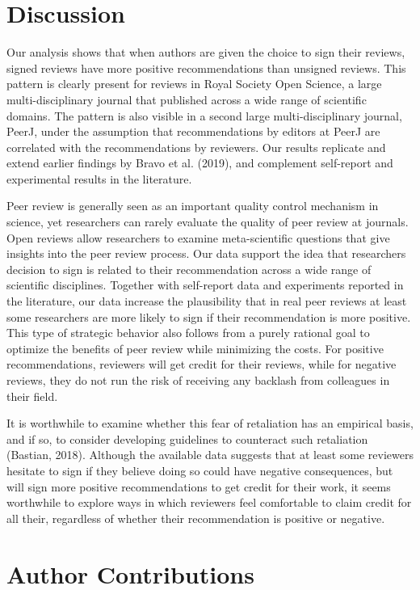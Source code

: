 \documentclass[,jou, a4paper,floatsintext]{apa6}
\begin{document}
\hypertarget{discussion}{%
\section{Discussion}\label{discussion}}

Our analysis shows that when authors are given the choice to sign their reviews, signed reviews have more positive recommendations than unsigned reviews. This pattern is clearly present for reviews in Royal Society Open Science, a large multi-disciplinary journal that published across a wide range of scientific domains. The pattern is also visible in a second large multi-disciplinary journal, PeerJ, under the assumption that recommendations by editors at PeerJ are correlated with the recommendations by reviewers. Our results replicate and extend earlier findings by Bravo et al. (2019), and complement self-report and experimental results in the literature.

Peer review is generally seen as an important quality control mechanism in science, yet researchers can rarely evaluate the quality of peer review at journals. Open reviews allow researchers to examine meta-scientific questions that give insights into the peer review process. Our data support the idea that researchers decision to sign is related to their recommendation across a wide range of scientific disciplines. Together with self-report data and experiments reported in the literature, our data increase the plausibility that in real peer reviews at least some researchers are more likely to sign if their recommendation is more positive. This type of strategic behavior also follows from a purely rational goal to optimize the benefits of peer review while minimizing the costs. For positive recommendations, reviewers will get credit for their reviews, while for negative reviews, they do not run the risk of receiving any backlash from colleagues in their field.

It is worthwhile to examine whether this fear of retaliation has an empirical basis, and if so, to consider developing guidelines to counteract such retaliation (Bastian, 2018). Although the available data suggests that at least some reviewers hesitate to sign if they believe doing so could have negative consequences, but will sign more positive recommendations to get credit for their work, it seems worthwhile to explore ways in which reviewers feel comfortable to claim credit for all their, regardless of whether their recommendation is positive or negative.

\hypertarget{author-contributions}{%
\section{Author Contributions}\label{author-contributions}}
\end{document}
